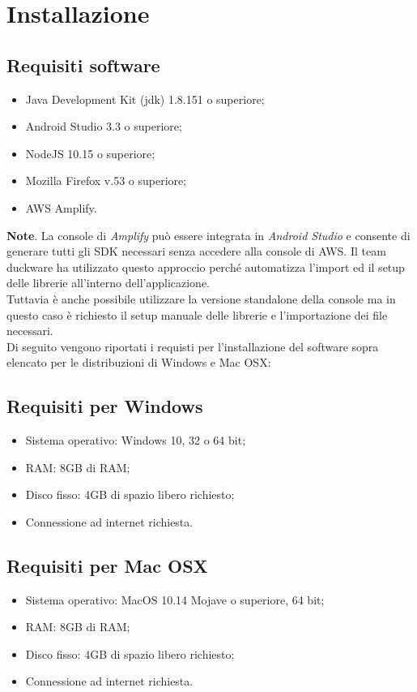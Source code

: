 \clearpage
\section{Installazione}
\label{sec:installazione}
\subsection{Requisiti software}
\begin{itemize}
    \item Java Development Kit (jdk) 1.8.151 o superiore;
    \item Android Studio 3.3 o superiore;
    \item NodeJS 10.15 o superiore;
    \item Mozilla Firefox v.53 o superiore;
    \item AWS Amplify.
\end{itemize}
\textbf{Note}. La console di \textit{Amplify} può essere integrata in \textit{Android Studio} e consente di generare tutti gli SDK necessari senza accedere alla console di AWS. Il team duckware ha utilizzato questo approccio perché automatizza l'import ed il setup delle librerie all'interno dell'applicazione.\\[0.25cm]
Tuttavia è anche possibile utilizzare la versione standalone della console ma in questo caso è richiesto il setup manuale delle librerie e l'importazione dei file necessari.\\[0.25cm]Di seguito vengono riportati i requisti per l'installazione del software sopra elencato per le distribuzioni di Windows e Mac OSX:
\subsection{Requisiti per Windows}
\begin{itemize}
    \item Sistema operativo: Windows 10, 32 o 64 bit;
    \item RAM: 8GB di RAM;
    \item Disco fisso: 4GB di spazio libero richiesto;
    \item Connessione ad internet richiesta.
\end{itemize}
\subsection{Requisiti per Mac OSX}
\begin{itemize}
    \item Sistema operativo: MacOS 10.14 Mojave o superiore, 64 bit;
    \item RAM: 8GB di RAM;
    \item Disco fisso: 4GB di spazio libero richiesto;
    \item Connessione ad internet richiesta.
\end{itemize}

